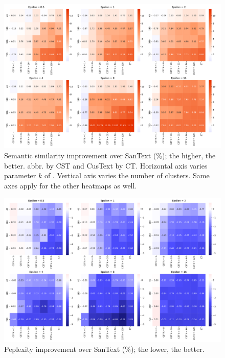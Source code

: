 \begin{figure}
    \centering
    \includegraphics[width=15cm]{fig/heatmap_semantic_sim.pdf}
    \caption{Semantic similarity improvement over SanText (\%); the higher, the better. \clusant abbr. by CST and CusText by CT. Horizontal axis varies parameter $k$ of \clusant. Vertical axis varies the number of clusters. Same axes apply for the other heatmaps as well.}
    \label{fig:semsim}
\end{figure}


\begin{figure}
    \centering
    \includegraphics[width=15cm]{fig/heatmap_perplexity.pdf}
    \caption{Peplexity improvement over SanText (\%); the lower, the better.}
    \label{fig:perplexity}
\end{figure}




